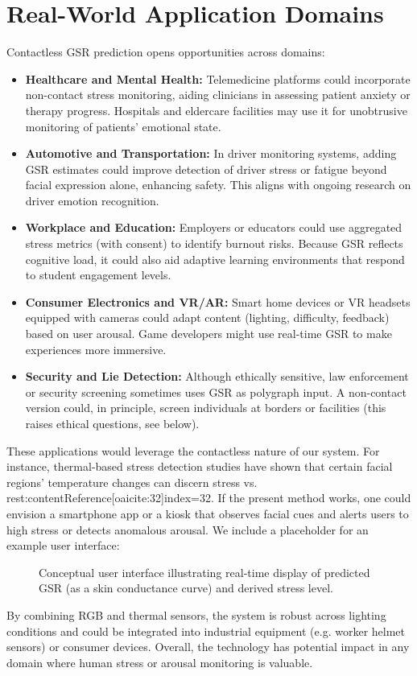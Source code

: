 \documentclass[12pt]{article}
\begin{document}
    \section{Real-World Application Domains}
    Contactless GSR prediction opens opportunities across domains:
    \begin{itemize}
        \item \textbf{Healthcare and Mental Health:} Telemedicine platforms could incorporate non-contact stress monitoring, aiding clinicians in assessing patient anxiety or therapy progress. Hospitals and eldercare facilities may use it for unobtrusive monitoring of patients’ emotional state.
        \item \textbf{Automotive and Transportation:} In driver monitoring systems, adding GSR estimates could improve detection of driver stress or fatigue beyond facial expression alone, enhancing safety. This aligns with ongoing research on driver emotion recognition.
        \item \textbf{Workplace and Education:} Employers or educators could use aggregated stress metrics (with consent) to identify burnout risks. Because GSR reflects cognitive load, it could also aid adaptive learning environments that respond to student engagement levels.
        \item \textbf{Consumer Electronics and VR/AR:} Smart home devices or VR headsets equipped with cameras could adapt content (lighting, difficulty, feedback) based on user arousal. Game developers might use real-time GSR to make experiences more immersive.
        \item \textbf{Security and Lie Detection:} Although ethically sensitive, law enforcement or security screening sometimes uses GSR as polygraph input. A non-contact version could, in principle, screen individuals at borders or facilities (this raises ethical questions, see below).
    \end{itemize}
    These applications would leverage the contactless nature of our system. For instance, thermal-based stress detection studies have shown that certain facial regions’ temperature changes can discern stress vs. rest:contentReference[oaicite:32]{index=32}. If the present method works, one could envision a smartphone app or a kiosk that observes facial cues and alerts users to high stress or detects anomalous arousal. We include a placeholder for an example user interface:
    \begin{figure}[ht]
        \centering
        \caption{Conceptual user interface illustrating real-time display of predicted GSR (as a skin conductance curve) and derived stress level.}
        \label{fig:ui}
    \end{figure}
    By combining RGB and thermal sensors, the system is robust across lighting conditions and could be integrated into industrial equipment (e.g. worker helmet sensors) or consumer devices. Overall, the technology has potential impact in any domain where human stress or arousal monitoring is valuable.
\end{document}

